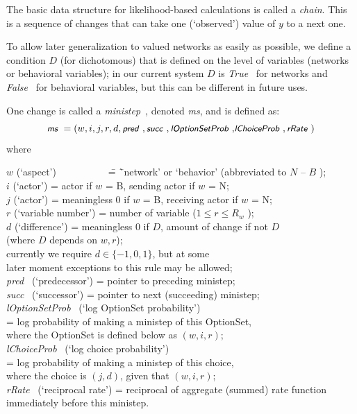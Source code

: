 \documentclass[a4paper,12pt,fleqn]{article}
\newcommand{\nnm}[1]{\textsf{\small\textit{#1}\ }}
\newcommand{\ms}{\textsl{\textsf{\small ms}}} %
\newcommand{\adda}[1]{{#1}}  %
\begin{document}
The basic data structure
for likelihood-based calculations
is called a \emph{chain}.
This is a sequence of changes that can take one (`observed') value
of $y$ to a next one.

To allow later generalization to valued networks as easily as possible,
we define a condition $D$ (for dichotomous) that is defined on the
level of variables (networks or behavioral variables);
in our current system $D$ is \nnm{True} for networks and \nnm{False} for
behavioral variables, but this can be different in future uses.


One change is called a \nnm{ministep}, denoted \ms, and is defined as:
\begin{equation}
    \ms \ = (w,i,j,r,d,\nnm{pred},\nnm{succ}, \adda{\nnm{lOptionSetProb}, }
                    \nnm{lChoiceProb}, \nnm{rRate})    \label{ministep}
\end{equation}
where
\begin{tabbing}
$w$ (`aspect') $\phantom{abcdefghij}$ \= = \= `network' or `behavior' (abbreviated to $N$ -- $B$ );\\
$i$ (`actor') \> = \> actor if $w$ = B, sending actor if $w$ = N;\\
$j$ (`actor') \> = \> meaningless 0 if $w$ = B, receiving actor if $w$ = N;\\
$r$ (`variable number') \> = \> number of variable ($1 \leq r \leq R_w$ );\\
$d$ (`difference') \> = \> meaningless 0 if $D$, amount of change if not $D$\\
   \> \>   (where $D $ depends on $w, r$);\\
   \> \>    currently we require $d \in \{-1, 0, 1\}$, but at some \\
   \> \>    later moment exceptions to this rule may be allowed;\\
\nnm{pred} (`predecessor') \> = \> pointer to preceding ministep;\\
\nnm{succ} (`successor') \> = \> pointer to next (succeeding) ministep;\\
\adda{
\nnm{lOptionSetProb} (`log OptionSet probability')} \\
\> = \> \adda{log probability of making a ministep of this OptionSet,}\\
    \> \>  \adda{ where the OptionSet is defined below as $(w,i,r)$;}\\
\adda{
\nnm{lChoiceProb}     (`log choice probability')} \\
\> = \> \adda{ log probability of making a ministep of this choice,}\\
    \> \>  \adda{ where the choice is $(j,d)$, given that $(w,i,r)$;}\\
\nnm{rRate} (`reciprocal rate') \> = \> reciprocal of aggregate (summed) rate function \\
   \> \>      immediately before this ministep.
\end{tabbing}
\end{document}
